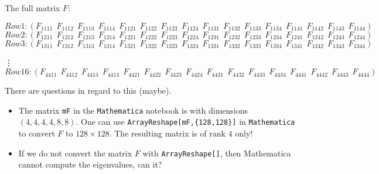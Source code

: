 \documentclass[12pt]{amsart}
\theoremstyle{definition}
\begin{document}
The full matrix $F$:
\tiny{
 \[
Row 1: (F_{1111} \ \ F_{1112} \ \ F_{1113} \  \ F_{1114} \  \
F_{1121} \ \  F_{1122} \ \ F_{1123}  \ \ F_{1124}   \ \
F_{1131} \ \   F_{1132} \ \  F_{1133} \ \  F_{1134} \ \
F_{1141} \ \   F_{1142} \ \  F_{1143} \ \  F_{1144})
\]
\[
Row 2: (F_{1211} \ \ F_{1212} \ \ F_{1213} \  \ F_{1214} \  \
F_{1221} \ \  F_{1222} \ \ F_{1223}  \ \ F_{1224}   \ \
F_{1231} \ \   F_{1232} \ \  F_{1233} \ \  F_{1234} \ \
F_{1241} \ \   F_{1242} \ \  F_{1243} \ \  F_{1244})
\]
\[
Row 3: (F_{1311} \ \ F_{1312} \ \ F_{1313} \  \ F_{1314} \  \
F_{1321} \ \  F_{1322} \ \ F_{1323}  \ \ F_{1324}   \ \
F_{1331} \ \   F_{1332} \ \  F_{1333} \ \  F_{1334} \ \
F_{1341} \ \   F_{1342} \ \  F_{1343} \ \  F_{1344})
\]

\quad \vdots
\[
Row 16: (F_{4411} \ \ F_{4412} \ \ F_{4413} \  \ F_{4414} \  \
F_{4421} \ \  F_{4422} \ \ F_{4423}  \ \ F_{4424}   \ \
F_{4431} \ \   F_{4432} \ \  F_{4433} \ \  F_{4434} \ \
F_{4441} \ \   F_{4442} \ \  F_{4443} \ \  F_{4444})
\]
}

{\color{magenta} There are questions in regard to this (maybe). 
\begin{itemize}
    \item 
The matrix \verb|mF| in the \verb|Mathematica| notebook is with dimensions $(4,4,4,4,8,8)$. One can use \verb|ArrayReshape[mF,{128,128}]| in \verb|Mathematica| to convert $F$ to $128 \times 128$. The resulting matrix is of rank $4$ only! 
\item If we do not convert the matrix $F$ with \verb|ArrayReshape[]|, then Mathematica cannot compute the eigenvalues, can it? 
\end{itemize}
}%





\newpage
\end{document}
